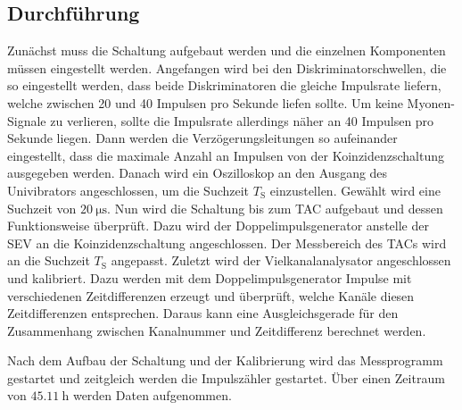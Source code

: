 \subsection{Durchführung}
Zunächst muss die Schaltung aufgebaut werden und die einzelnen Komponenten müssen eingestellt werden. Angefangen wird bei den Diskriminatorschwellen, die so eingestellt werden, dass
beide Diskriminatoren die gleiche Impulsrate liefern, welche zwischen 20 und 40 Impulsen pro Sekunde liefen sollte. Um keine Myonen-Signale zu verlieren, sollte die Impulsrate allerdings näher an 40
Impulsen pro Sekunde liegen. Dann werden die Verzögerungsleitungen so aufeinander eingestellt, dass
die maximale Anzahl an Impulsen von der Koinzidenzschaltung ausgegeben werden. Danach wird ein Oszilloskop an den Ausgang des Univibrators angeschlossen, um die Suchzeit $T_\text{S}$ einzustellen.
Gewählt wird eine Suchzeit von $\SI{20}{\micro\second}$. Nun wird die Schaltung bis zum TAC aufgebaut und dessen Funktionsweise überprüft. Dazu wird der Doppelimpulsgenerator anstelle der SEV an die
Koinzidenzschaltung angeschlossen. Der Messbereich des TACs wird an die Suchzeit $T_\text{S}$ angepasst. Zuletzt wird der Vielkanalanalysator angeschlossen und kalibriert. Dazu werden mit dem Doppelimpulsgenerator
Impulse mit verschiedenen Zeitdifferenzen erzeugt und überprüft, welche Kanäle diesen Zeitdifferenzen entsprechen. Daraus kann eine Ausgleichsgerade für den Zusammenhang zwischen Kanalnummer und Zeitdifferenz berechnet
werden.

Nach dem Aufbau der Schaltung und der Kalibrierung wird das Messprogramm gestartet und zeitgleich werden die Impulszähler gestartet. Über einen Zeitraum von $\SI{45.11}{\hour}$ werden Daten aufgenommen.
